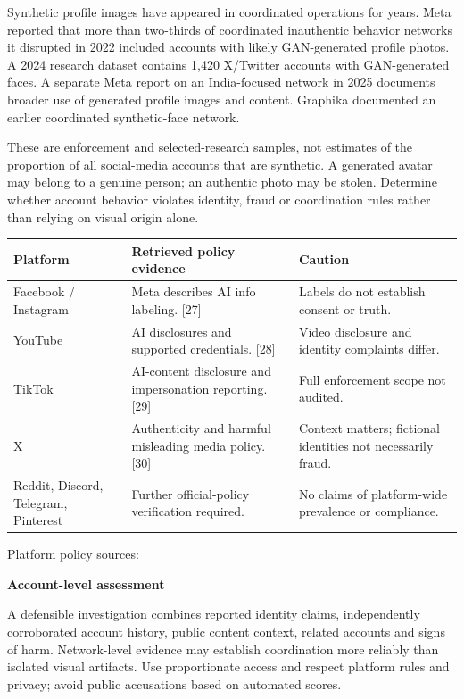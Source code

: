 \documentclass[10pt,a4paper]{article}
\newcommand{\sub}[1]{\vspace{1mm}\textbf{#1}\par}
\begin{document}
Synthetic profile images have appeared in coordinated operations for years. Meta reported that more than two-thirds of coordinated inauthentic behavior networks it disrupted in 2022 included accounts with likely GAN-generated profile photos. A 2024 research dataset contains 1,420 X/Twitter accounts with GAN-generated faces. A separate Meta report on an India-focused network in 2025 documents broader use of generated profile images and content. Graphika documented an earlier coordinated synthetic-face network. \cite{meta,fakefaces,metaindia,graphika}


These are enforcement and selected-research samples, not estimates of the proportion of all social-media accounts that are synthetic. A generated avatar may belong to a genuine person; an authentic photo may be stolen. Determine whether account behavior violates identity, fraud or coordination rules rather than relying on visual origin alone.


\begin{center}\small\begin{tabularx}{\linewidth}{@{}YYY@{}}\toprule
\textbf{Platform} & \textbf{Retrieved policy evidence} & \textbf{Caution}\\\midrule
Facebook / Instagram & Meta describes AI info labeling. [27] & Labels do not establish consent or truth.\\
YouTube & AI disclosures and supported credentials. [28] & Video disclosure and identity complaints differ.\\
TikTok & AI-content disclosure and impersonation reporting. [29] & Full enforcement scope not audited.\\
X & Authenticity and harmful misleading media policy. [30] & Context matters; fictional identities not necessarily fraud.\\
Reddit, Discord, Telegram, Pinterest & Further official-policy verification required. & No claims of platform-wide prevalence or compliance.\\\bottomrule\end{tabularx}\end{center}

Platform policy sources:  \cite{metalabel,youtube,tiktok,xpolicy}


\sub{Account-level assessment}

A defensible investigation combines reported identity claims, independently corroborated account history, public content context, related accounts and signs of harm. Network-level evidence may establish coordination more reliably than isolated visual artifacts. Use proportionate access and respect platform rules and privacy; avoid public accusations based on automated scores.
\end{document}
